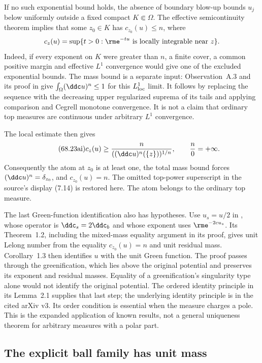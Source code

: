 If no such exponential bound holds, the absence of boundary
blow-up bounds $u_j$ below uniformly outside a fixed compact
$K\Subset\Omega$. The effective semicontinuity theorem
\cite[Main Theorem~0.2(2)]{DK01} implies that some $z_0\in K$
has $c_{z_0}(u)\leq n$, where
\[
 c_z(u)=\sup\{t>0:\rme^{-tu}\text{ is locally integrable near }z\}.
\]
Indeed, if every exponent on $K$ were greater than $n$, a finite
cover, a common positive margin and effective $L^1$ convergence
would give one of the excluded exponential bounds. The mass
bound is a separate input: Observation~A.3 and its proof in
\cite{Demailly07LocalAlgebraV2} give
$\int_\Omega(\ddc u)^n\leq1$ for this $L^1_{\rm loc}$ limit.
It follows by replacing the sequence with the decreasing upper
regularized suprema of its tails and applying comparison and
Cegrell monotone convergence. It is not a claim that ordinary
top measures are continuous under arbitrary $L^1$ convergence.

The local estimate
\cite[Theorem~5.5 and Proposition~6.3]{ACKPZ08PartialEnergyV3}
then gives
\[
\tag{68.23ai}\label{eq:ytd-local-critical-atom-bound}
 c_z(u)\geq
       \frac{n}{((\ddc u)^n(\{z\}))^{1/n}},
 \qquad\frac{n}{0}=+\infty.
\]
Consequently the atom at $z_0$ is at least one, the total mass
bound forces $(\ddc u)^n=\delta_{z_0}$, and $c_{z_0}(u)=n$.
The omitted top-power superscript in the source's display (7.14)
is restored here. The atom belongs to the ordinary top measure.

The last Green-function identification also has hypotheses.
Use $u_s=u/2$ in \cite{Rash15ExtremalPublished}, whose
operator is $\ddc_s=2\ddc_b$ and whose exponent uses
$\rme^{-2c u_s}$. Its Theorem~1.2, including the mixed-mass
equality argument in its proof, gives unit Lelong number from
the equality $c_{z_0}(u)=n$ and unit residual mass. Corollary~1.3
then identifies $u$ with the unit Green function. The proof
passes through the greenification, which lies above the
original potential and preserves its exponent and residual
masses. Equality of a greenification's singularity type alone
would not identify the original potential.
The ordered identity principle in its Lemma~2.1 supplies that
last step; the underlying identity principle is
\cite[Theorem~3.6]{ACCH08PolarMeasuresV3} in the cited arXiv v3.
Its order condition is essential when the measure charges a pole.
This is the expanded application of known results, not a general
uniqueness theorem for arbitrary measures with a polar part.

\subsection{The explicit ball family has unit mass}
\label{sec:ytd-local-critical-ball}

